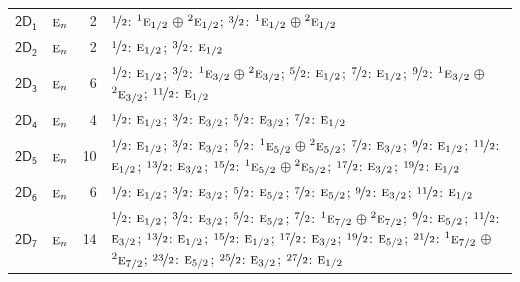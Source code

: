 \documentclass[10pt,a4paper]{article}
\numberwithin{equation}{section}
\newcommand{\grp}[1]{\mathsf{#1}}
\newcommand{\irr}[1]{\text{\normalfont\scshape #1}}
\newcommand{\conjpair}[1]{{}^{#1}}
\newlength{\fillwidth}\newlength{\cellwidth}\newlength{\colwidth}
\begin{document}
{\begin{longtable}{@{}llr>{\RaggedRight\arraybackslash}p{\fillwidth}@{}}
\href{2D1.pdf}{$\grp{2D_{1}}$} & $\irr{e}_{n}$ & 2 & $\nicefrac{1}{2}$: $\conjpair{1}\irr{e}_{1/2}$${}\oplus{}$$\conjpair{2}\irr{e}_{1/2}$; $\nicefrac{3}{2}$: $\conjpair{1}\irr{e}_{1/2}$${}\oplus{}$$\conjpair{2}\irr{e}_{1/2}$\\
\href{2D2.pdf}{$\grp{2D_{2}}$} & $\irr{e}_{n}$ & 2 & $\nicefrac{1}{2}$: $\irr{e}_{1/2}$; $\nicefrac{3}{2}$: $\irr{e}_{1/2}$\\
\href{2D3.pdf}{$\grp{2D_{3}}$} & $\irr{e}_{n}$ & 6 & $\nicefrac{1}{2}$: $\irr{e}_{1/2}$; $\nicefrac{3}{2}$: $\conjpair{1}\irr{e}_{3/2}$${}\oplus{}$$\conjpair{2}\irr{e}_{3/2}$; $\nicefrac{5}{2}$: $\irr{e}_{1/2}$; $\nicefrac{7}{2}$: $\irr{e}_{1/2}$; $\nicefrac{9}{2}$: $\conjpair{1}\irr{e}_{3/2}$${}\oplus{}$$\conjpair{2}\irr{e}_{3/2}$; $\nicefrac{11}{2}$: $\irr{e}_{1/2}$\\
\href{2D4.pdf}{$\grp{2D_{4}}$} & $\irr{e}_{n}$ & 4 & $\nicefrac{1}{2}$: $\irr{e}_{1/2}$; $\nicefrac{3}{2}$: $\irr{e}_{3/2}$; $\nicefrac{5}{2}$: $\irr{e}_{3/2}$; $\nicefrac{7}{2}$: $\irr{e}_{1/2}$\\
\href{2D5.pdf}{$\grp{2D_{5}}$} & $\irr{e}_{n}$ & 10 & $\nicefrac{1}{2}$: $\irr{e}_{1/2}$; $\nicefrac{3}{2}$: $\irr{e}_{3/2}$; $\nicefrac{5}{2}$: $\conjpair{1}\irr{e}_{5/2}$${}\oplus{}$$\conjpair{2}\irr{e}_{5/2}$; $\nicefrac{7}{2}$: $\irr{e}_{3/2}$; $\nicefrac{9}{2}$: $\irr{e}_{1/2}$; $\nicefrac{11}{2}$: $\irr{e}_{1/2}$; $\nicefrac{13}{2}$: $\irr{e}_{3/2}$; $\nicefrac{15}{2}$: $\conjpair{1}\irr{e}_{5/2}$${}\oplus{}$$\conjpair{2}\irr{e}_{5/2}$; $\nicefrac{17}{2}$: $\irr{e}_{3/2}$; $\nicefrac{19}{2}$: $\irr{e}_{1/2}$\\
\href{2D6.pdf}{$\grp{2D_{6}}$} & $\irr{e}_{n}$ & 6 & $\nicefrac{1}{2}$: $\irr{e}_{1/2}$; $\nicefrac{3}{2}$: $\irr{e}_{3/2}$; $\nicefrac{5}{2}$: $\irr{e}_{5/2}$; $\nicefrac{7}{2}$: $\irr{e}_{5/2}$; $\nicefrac{9}{2}$: $\irr{e}_{3/2}$; $\nicefrac{11}{2}$: $\irr{e}_{1/2}$\\
\href{2D7.pdf}{$\grp{2D_{7}}$} & $\irr{e}_{n}$ & 14 & $\nicefrac{1}{2}$: $\irr{e}_{1/2}$; $\nicefrac{3}{2}$: $\irr{e}_{3/2}$; $\nicefrac{5}{2}$: $\irr{e}_{5/2}$; $\nicefrac{7}{2}$: $\conjpair{1}\irr{e}_{7/2}$${}\oplus{}$$\conjpair{2}\irr{e}_{7/2}$; $\nicefrac{9}{2}$: $\irr{e}_{5/2}$; $\nicefrac{11}{2}$: $\irr{e}_{3/2}$; $\nicefrac{13}{2}$: $\irr{e}_{1/2}$; $\nicefrac{15}{2}$: $\irr{e}_{1/2}$; $\nicefrac{17}{2}$: $\irr{e}_{3/2}$; $\nicefrac{19}{2}$: $\irr{e}_{5/2}$; $\nicefrac{21}{2}$: $\conjpair{1}\irr{e}_{7/2}$${}\oplus{}$$\conjpair{2}\irr{e}_{7/2}$; $\nicefrac{23}{2}$: $\irr{e}_{5/2}$; $\nicefrac{25}{2}$: $\irr{e}_{3/2}$; $\nicefrac{27}{2}$: $\irr{e}_{1/2}$\\

\end{longtable}}
\end{document}
